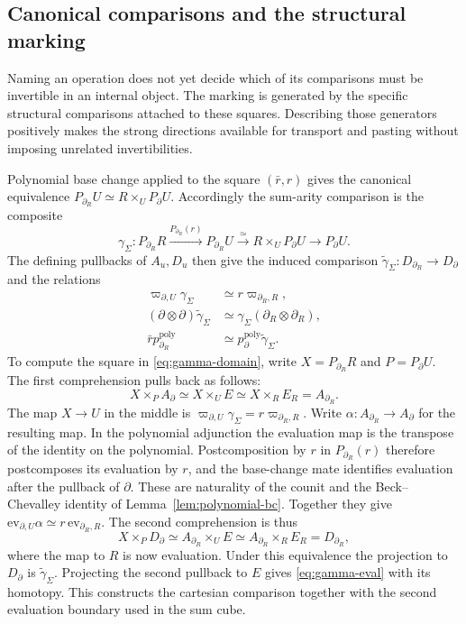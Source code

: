 \documentclass[oneside]{article}
\theoremstyle{plain}
\theoremstyle{definition}
\theoremstyle{remark}
\begin{document}
\subsection{Canonical comparisons and the structural marking}

Naming an operation does not yet decide which of its comparisons must be
invertible in an internal object. The marking is generated by the
specific structural comparisons attached to these squares. Describing
those generators positively makes the strong directions available for
transport and pasting without imposing unrelated invertibilities.

Polynomial base change applied to the square $(\bar r,r)$ gives the
canonical equivalence
$P_{\partial_R}U\simeq R\times_U P_\partial U$.
Accordingly the sum-arity comparison is the composite
\[
 \gamma_\Sigma:
 P_{\partial_R}R\xrightarrow{P_{\partial_R}(r)}
 P_{\partial_R}U\xrightarrow{\simeq}
 R\times_U P_\partial U\longrightarrow P_\partial U.
\]
The defining pullbacks of $A_u,D_u$ then give the induced comparison
$\widetilde\gamma_\Sigma:D_{\partial_R}\to D_\partial$ and the
relations
\begin{align}
 \varpi_{\partial,U}\gamma_\Sigma
   &\simeq r\varpi_{\partial_R,R},\label{eq:gamma-base}\\
 (\partial\otimes\partial)\widetilde\gamma_\Sigma
   &\simeq\gamma_\Sigma(\partial_R\otimes\partial_R),
     \label{eq:gamma-domain}\\
 \bar r p^{\mathrm{poly}}_{\partial_R}
   &\simeq p^{\mathrm{poly}}_\partial\widetilde\gamma_\Sigma.
     \label{eq:gamma-eval}
\end{align}
To compute the square in \eqref{eq:gamma-domain}, write
$X=P_{\partial_R}R$ and $P=P_\partial U$. The first comprehension
pulls back as follows:
\[
 X\times_P A_\partial
 \simeq X\times_U E
 \simeq X\times_R E_R=A_{\partial_R}.
\]
The map $X\to U$ in the middle is
$\varpi_{\partial,U}\gamma_\Sigma=r\varpi_{\partial_R,R}$.
Write $\alpha:A_{\partial_R}\to A_\partial$ for the resulting map.
In the polynomial adjunction the evaluation map is the transpose
of the identity on the polynomial. Postcomposition by $r$ in
$P_{\partial_R}(r)$ therefore postcomposes its evaluation by $r$,
and the base-change mate identifies evaluation after the pullback
of $\partial$. These are naturality of the counit and the
Beck--Chevalley identity of Lemma~\ref{lem:polynomial-bc}. Together
they give $\mathrm{ev}_{\partial,U}\alpha
\simeq r\,\mathrm{ev}_{\partial_R,R}$. The second comprehension is
thus
\[
 X\times_P D_\partial
 \simeq A_{\partial_R}\times_U E
 \simeq A_{\partial_R}\times_R E_R=D_{\partial_R},
\]
where the map to $R$ is now evaluation. Under this equivalence the
projection to $D_\partial$ is $\widetilde\gamma_\Sigma$.
Projecting the second pullback to $E$ gives
\eqref{eq:gamma-eval} with its homotopy. This constructs the
cartesian comparison together with the second evaluation boundary
used in the sum cube.
\end{document}
